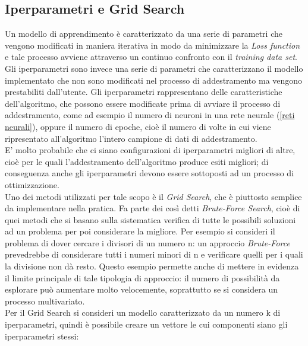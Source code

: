 \newpage


\subsection{Iperparametri e Grid Search}
\label{iperparametri e grid search}

Un modello di apprendimento è caratterizzato da una serie di parametri che vengono modificati in maniera iterativa in modo da minimizzare la \textit{Loss function} e tale processo avviene attraverso un continuo confronto con il \textit{training data set}.\\ 
Gli iperparametri sono invece una serie di parametri che caratterizzano il modello implementato che non sono modificati nel processo di addestramento ma vengono prestabiliti dall'utente. Gli iperparametri rappresentano delle caratteristiche dell'algoritmo, che possono essere modificate prima di avviare il processo di addestramento, come ad esempio il numero di neuroni in una rete neurale (\ref{reti neurali}), oppure il numero di epoche, cioè il numero di volte in cui viene ripresentato all'algoritmo l'intero campione di dati di addestramento.\\
E' molto probabile che ci siano configurazioni di iperparametri migliori di altre, cioè per le quali l'addestramento dell'algoritmo produce esiti migliori; di conseguenza anche gli iperparametri devono essere sottoposti ad un processo di ottimizzazione. \\
Uno dei metodi utilizzati per tale scopo è il \textit{Grid Search}, che è piuttosto semplice da implementare nella pratica. Fa parte dei così detti \textit{Brute-Force Search}, cioè di quei metodi che si basano sulla sistematica verifica di tutte le possibili soluzioni ad un problema per poi considerare la migliore. Per esempio si consideri il problema di dover cercare i divisori di un numero n: un approccio \textit{Brute-Force} prevedrebbe di considerare tutti i numeri minori di n e verificare quelli per i quali la divisione non dà resto. Questo esempio permette anche di mettere in evidenza il limite principale di tale tipologia di approccio: il numero di possibilità da esplorare può aumentare molto velocemente, soprattutto se si considera un processo multivariato. \\
Per il Grid Search si consideri un modello caratterizzato da un numero k di iperparametri, quindi è possibile creare un vettore le cui componenti siano gli iperparametri stessi:
